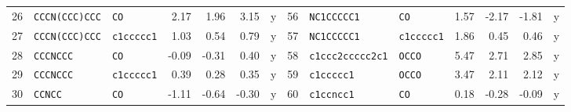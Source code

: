 \begin{table}[t]
{\begin{tabular}{@{}rllrrrc@{\hspace{1.2em}}rllrrrc@{}}
26 & \texttt{CCCN(CCC)CCC} & \texttt{CO} & 2.17 & 1.96 & 3.15 & y & 56 & \texttt{NC1CCCCC1} & \texttt{CO} & 1.57 & -2.17 & -1.81 & y \\
27 & \texttt{CCCN(CCC)CCC} & \texttt{c1ccccc1} & 1.03 & 0.54 & 0.79 & y & 57 & \texttt{NC1CCCCC1} & \texttt{c1ccccc1} & 1.86 & 0.45 & 0.46 & y \\
28 & \texttt{CCCNCCC} & \texttt{CO} & -0.09 & -0.31 & 0.40 & y & 58 & \texttt{c1ccc2ccccc2c1} & \texttt{OCCO} & 5.47 & 2.71 & 2.85 & y \\
29 & \texttt{CCCNCCC} & \texttt{c1ccccc1} & 0.39 & 0.28 & 0.35 & y & 59 & \texttt{c1ccccc1} & \texttt{OCCO} & 3.47 & 2.11 & 2.12 & y \\
30 & \texttt{CCNCC} & \texttt{CO} & -1.11 & -0.64 & -0.30 & y & 60 & \texttt{c1ccncc1} & \texttt{CO} & 0.18 & -0.28 & -0.09 & y\\
\bottomrule
\end{tabular}
}
\end{table}


